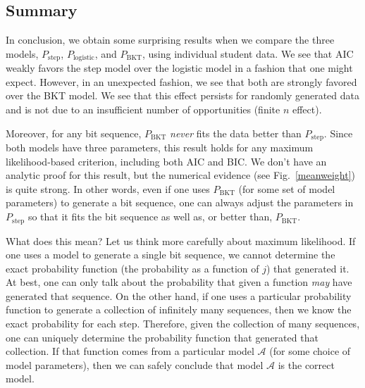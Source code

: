 \documentclass{edm_template}
\begin{document}
\subsection{Summary}

In conclusion, we obtain some surprising results when we compare
the three models,  $P_\mathrm{step}$, $P_\mathrm{logistic}$, and
$P_\mathrm{BKT}$, using individual student data.   We see that AIC
weakly favors the step model over the logistic model in a fashion 
that one might expect.  However, in an unexpected fashion, we see 
that both are strongly favored over the BKT model.
We see that this effect persists for
randomly generated data and is not due to an insufficient number
of opportunities (finite $n$ effect).

Moreover, for any bit sequence,  $P_\mathrm{BKT}$ {\em never}
fits the data better than $P_\mathrm{step}$.  Since 
both models have three parameters, this result holds for any maximum
likelihood-based criterion, including both AIC and BIC.  We don't have
an analytic proof for this result, 
but the numerical evidence (see Fig.~\ref{meanweight}) is quite strong.
In other words, even if one uses $P_\mathrm{BKT}$ (for some set of model parameters) 
to generate a bit sequence, one can
always adjust the parameters in $P_\mathrm{step}$ so that it
fits the bit sequence as well as, or better than, $P_\mathrm{BKT}$.




What does this mean?  Let us think
more carefully about maximum likelihood.
If one uses a model to generate a single bit sequence, we cannot 
determine the exact probability function (the probability as a
function of $j$) that generated it.  At best, one can only
talk about the probability that given a function {\em may} have 
generated that sequence.
On the other hand, if one uses a particular probability function to generate a collection 
of infinitely many sequences, then we know the exact probability for each step.
Therefore, given the collection of many sequences, one can uniquely 
determine the probability function that generated that collection. 
If that function comes from a
particular model $\mathcal{A}$ (for some choice of model parameters),
then we can safely conclude that model $\mathcal{A}$ is the correct model.
\end{document}

